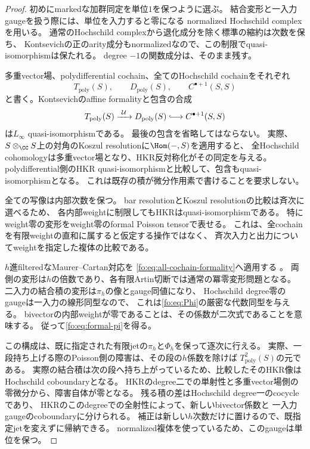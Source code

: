 \begin{proof}
初めにmarkedな加群同定を単位$1$を保つように選ぶ。
結合変形と一入力gaugeを扱う際には、単位を入力すると零になる
normalized Hochschild complexを用いる。
通常のHochschild complexから退化成分を除く標準の縮約は次数を保ち、
Kontsevichの正のarity成分もnormalizedなので、この制限でquasi-isomorphismは保たれる。
degree $-1$の関数成分は、そのまま残す。

多重vector場、polydifferential cochain、全てのHochschild cochainをそれぞれ
\[
 T_{\mathrm{poly}}(S),\qquad
 D_{\mathrm{poly}}(S),\qquad
 C^{\bullet+1}(S,S)
\]
と書く。Kontsevichのaffine formalityと包含の合成
\begin{equation}\label{fo:eq:all-cochain-formality}
 T_{\mathrm{poly}}(S)
 \xrightarrow{\ \mathcal U\ }
 D_{\mathrm{poly}}(S)
 \lhook\joinrel\longrightarrow
 C^{\bullet+1}(S,S)
\end{equation}
は$L_\infty$ quasi-isomorphismである。
最後の包含を省略してはならない。
実際、$S\otimes_\CC S$上の対角のKoszul resolutionに$\Hom(-,S)$を適用すると、
全Hochschild cohomologyは多重vector場となり、HKR反対称化がその同定を与える。
polydifferential側のHKR quasi-isomorphismと比較して、包含もquasi-isomorphismとなる。
これは既存の積が微分作用素で書けることを要求しない。

全ての写像は内部次数を保つ。
bar resolutionとKoszul resolutionの比較は斉次に選べるため、
各内部weightに制限してもHKRはquasi-isomorphismである。
特にweight零の変形をweight零のformal Poisson tensorで表せる。
これは、全cochainを有限weightの直和に属すると仮定する操作ではなく、
斉次入力と出力についてweightを指定した複体の比較である。

$h$進filteredなMaurer--Cartan対応を
\eqref{fo:eq:all-cochain-formality}へ適用する
\cite[Section~4.4, Theorem]{PKontsevich}。
両側の変形は$h$の倍数であり、各有限Artin切断では通常の冪零変形問題となる。
二入力の結合積の変形は$\pi_h$の像とgauge同値になり、
Hochschild degree零のgaugeは一入力の線形同型なので、
これは\eqref{fo:eq:Phi}の厳密な代数同型を与える。
bivectorの内部weightが零であることは、その係数が二次式であることを意味する。
従って\eqref{fo:eq:formal-pi}を得る。

この構成は、既に指定された有限jetの$\pi_h$と$\Phi_h$を保って逐次に行える。
実際、一段持ち上げる際のPoisson側の障害は、その段の$h$係数を除けば
$T_{\mathrm{poly}}^2(S)$の元である。
実際の結合積は次の段へ持ち上がっているため、比較したそのHKR像は
Hochschild coboundaryとなる。
HKRのdegree二での単射性と多重vector場側の零微分から、障害自体が零となる。
残る積の差はHochschild degree一のcocycleであり、
HKRのこのdegreeでの全射性によって、新しいbivector係数と
一入力gaugeのcoboundaryに分けられる。
補正は新しい$h$次数だけに置けるので、既指定jetを変えずに帰納できる。
normalized複体を使っているため、このgaugeは単位を保つ。


\end{proof}
